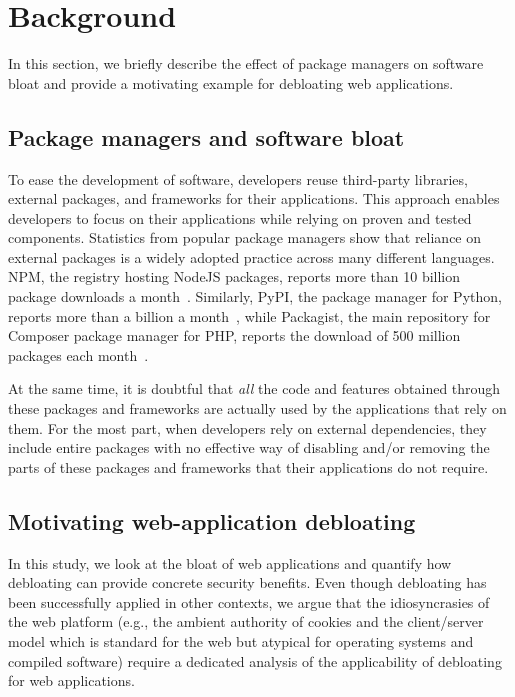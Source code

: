\section{Background}
\label{sec:background}

In this section, we briefly describe the effect of package managers on software
bloat and provide a motivating example for debloating web applications.


\subsection{Package managers and software bloat}
To ease the development of software, developers reuse third-party libraries,
external packages, and frameworks for their applications. This approach
enables developers to focus on their applications while relying on
proven and tested components. Statistics from popular package managers show
that reliance on external packages is a widely adopted practice across
many different languages. NPM, the registry hosting NodeJS packages,
reports more than 10 billion package downloads a
month~\cite{nodeDownloads}. Similarly, PyPI, the package manager for Python,
reports more than a billion a month~\cite{pypiDownloads}, while Packagist, the main repository for
Composer package manager for PHP, reports the download of 500 million
packages each month~\cite{packagistDownloads}.

At the same time, it is doubtful that \emph{all} the code and features
obtained through these packages and frameworks are actually used by
the applications that rely on them. For the most part, when developers rely on
external dependencies, they include entire packages with no effective way of
disabling and/or removing the parts of these packages and frameworks that
their applications do not require.

\subsection{Motivating web-application debloating}

In this study, we look at the bloat of web applications and quantify how
debloating can provide concrete security benefits. Even
though debloating has been successfully applied in other contexts, we argue
that the
idiosyncrasies of the web platform (e.g., the ambient authority of cookies and
the client/server model which is standard for the web but atypical
for operating systems and compiled software) require a dedicated analysis
of the applicability of debloating for web applications.

